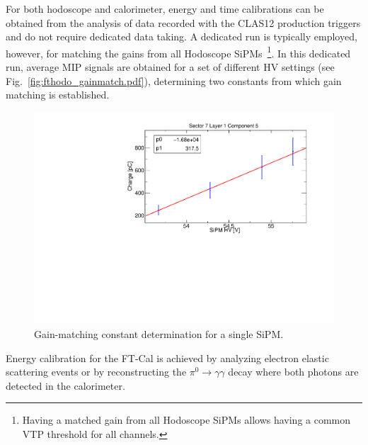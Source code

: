 For both hodoscope and calorimeter, energy and time calibrations can be obtained from the analysis of data recorded with the CLAS12 production triggers and do not require dedicated data taking. A dedicated run is typically employed, however, for matching the gains from all Hodoscope SiPMs~\footnote{Having a matched gain from all Hodoscope SiPMs allows having a common VTP threshold for all channels. }. In this dedicated run, average MIP signals are obtained for a set of different HV settings (see Fig.~\ref{fig:fthodo_gainmatch.pdf}), determining two constants from which gain matching is established.
\begin{figure}
\includegraphics[width=1.0\columnwidth]{fig/fthodo_gainmatch.pdf}
\caption{Gain-matching constant determination for a single SiPM.}
\label{fig:fthodo_gainmatch}
\end{figure}


Energy calibration for the FT-Cal is achieved by analyzing electron elastic scattering events or by reconstructing the $\pi^0\to\gamma\gamma$ decay where both photons are detected in the calorimeter. 

